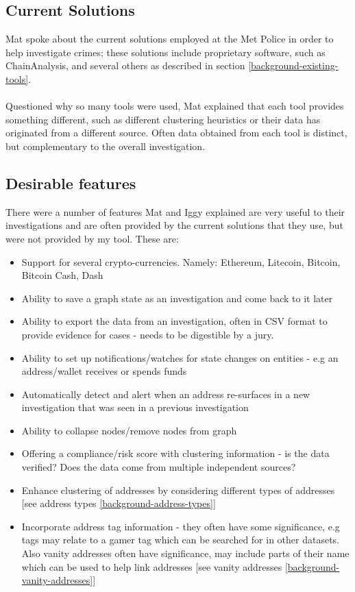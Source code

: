 \subsection{Current Solutions}
Mat spoke about the current solutions employed at the Met Police in order to help investigate crimes; these solutions include proprietary software, such as ChainAnalysis, and several others as described in section \ref{background-existing-tools}. 
\\\\
Questioned why so many tools were used, Mat explained that each tool provides something different, such as different clustering heuristics or their data has originated from a different source. Often data obtained from each tool is distinct, but complementary to the overall investigation.  

\subsection{Desirable features}
There were a number of features Mat and Iggy explained are very useful to their investigations and are often provided by the current solutions that they use, but were not provided by my tool. These are:
\begin{itemize}
    \item Support for several crypto-currencies. Namely: Ethereum, Litecoin, Bitcoin, Bitcoin Cash, Dash
    \item Ability to save a graph state as an investigation and come back to it later
    \item Ability to export the data from an investigation, often in CSV format to provide evidence for cases - needs to be digestible by a jury.
    \item Ability to set up notifications/watches for state changes on entities - e.g an address/wallet receives or spends funds 
    \item Automatically detect and alert when an address re-surfaces in a new investigation that was seen in a previous investigation 
    \item Ability to collapse nodes/remove nodes from graph 
    \item Offering a compliance/risk score with clustering information - is the data verified? Does the data come from multiple independent sources? 
    \item Enhance clustering of addresses by considering different types of addresses [see address types \ref{background-address-types}]
    \item Incorporate address tag information - they often have some significance, e.g tags may relate to a gamer tag which can be searched for in other datasets. Also vanity addresses often have significance, may include parts of their name which can be used to help link addresses [see vanity addresses \ref{background-vanity-addresses}]
\end{itemize}


